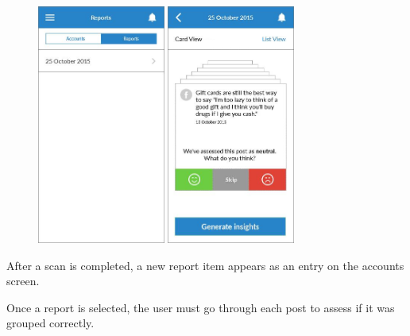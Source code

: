 \begin{figure}
  \subfigures
  \centering
  \begin{minipage}{4.6cm}
    \centering
    \includegraphics[width=4.2cm]{inc/ui_report_card_mode_step1.jpg}
    \caption{}
    \label{fig:ui_report_card_mode_step1}
  \end{minipage}
  \begin{minipage}{4.6cm}
    \centering
    \includegraphics[width=4.2cm]{inc/ui_report_card_mode_step2.jpg}
    \caption{}
    \label{fig:ui_report_card_mode_step2}
  \end{minipage}
\end{figure}

\begin{minipage}{\textwidth}
  \centering
  \begin{minipage}[t]{4.6cm}
    \vspace{0pt}
    \centering
    \begin{minipage}{4.4cm}
      After a scan is completed, a new report item appears as an entry on the accounts screen.
    \end{minipage}
  \end{minipage}
  \begin{minipage}[t]{4.6cm}
    \vspace{0pt}
    \centering
    \begin{minipage}{4.4cm}
      Once a report is selected, the user must go through each post to assess if it was grouped correctly.
    \end{minipage}
  \end{minipage}
\end{minipage}

